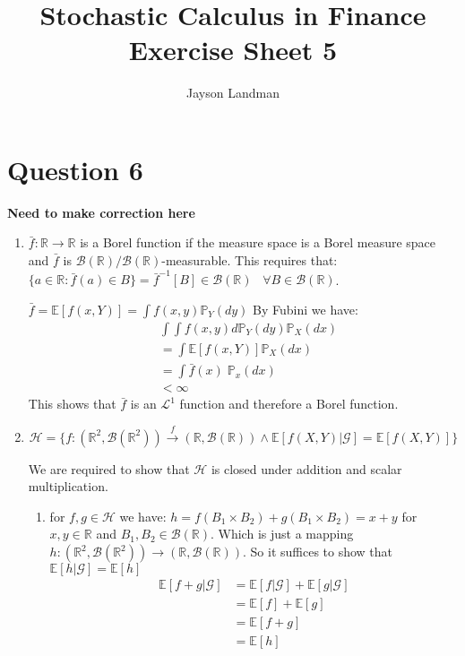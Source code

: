 \documentclass[12pt, letterpaper]{article}
\title{Stochastic Calculus in Finance\\
		\large Exercise Sheet 5}
\author{Jayson Landman}
\begin{document}
	\section*{Question 6}
	 
	 
	 \textbf{Need to make correction here}
	\begin{enumerate} [label = \textbf{\alph*)}]
	\item $\bar{f} : \mathbb{R} \rightarrow \mathbb{R}$ is a Borel function if the measure space is a Borel measure space and $\bar{f}$ is $\mathcal{B}(\mathbb{R})/\mathcal{B}(\mathbb{R})$-measurable. This requires that: \newline $\{a \in \mathbb{R} : \bar{f}(a) \in B \}  = \bar{f}^{-1}[B] \in \mathcal{B}(\mathbb{R}) \; \; \; \forall B \in \mathcal{B}(\mathbb{R})$.

	\vspace{0.3cm}
	$\bar{f} = \mathbb{E}[f(x, Y)] = \int f(x, y) \mathbb{P}_Y (dy)$ \newline
	By Fubini we have: \begin{align*}
		& \int \int f(x, y) d\mathbb{P}_Y (dy) \mathbb{P}_X (dx) \\
		& = \int \mathbb{E}[f(x, Y)] \mathbb{P}_X (dx) \\
		& = \int \bar{f}(x) \;\mathbb{P}_x (dx) \\
		& < \infty \tag{$f$ is a bounded function}
	\end{align*}
	This shows that $\bar{f}$ is an $\mathcal{L}^1$ function and therefore a Borel function.
	
	\item  $$\mathcal{H} = \bigg\{ f : (\mathbb{R}^2, \mathcal{B}(\mathbb{R}^2)) \xrightarrow{f}(\mathbb{R}, \mathcal{B}(\mathbb{R})) \wedge \mathbb{E}[f(X, Y)|\mathcal{G}]=\mathbb{E}[f(X, Y)] \bigg \}$$
	
	We are required to show that $\mathcal{H}$ is closed under addition and scalar multiplication.
	
	\begin{enumerate} [label = \roman*)]
		\item for $f, g \in \mathcal{H}$ we have: \newline
		$h = f(B_1\times B_2)+g(B_1\times B_2) = x +y$ for $x, y \in \mathbb{R}$ and $B_1, B_2 \in \mathcal{B}(\mathbb{R})$. \newline Which is just a mapping $h : (\mathbb{R}^2, \mathcal{B}(\mathbb{R}^2)) \rightarrow (\mathbb{R}, \mathcal{B}(\mathbb{R}))$. \newline
		So it suffices to show that $\mathbb{E}[h|\mathcal{G}] = \mathbb{E}[h]$ 
\begin{align*}
	\mathbb{E}[f + g|\mathcal{G}] & = \mathbb{E}[f|\mathcal{G}] + \mathbb{E}[g|\mathcal{G}] \\
	& = \mathbb{E}[f] + \mathbb{E}[g] \\ 
	& = \mathbb{E}[f + g] \\
	& = \mathbb{E}[h]
\end{align*}


\end{enumerate}
\end{enumerate}
\end{document}
